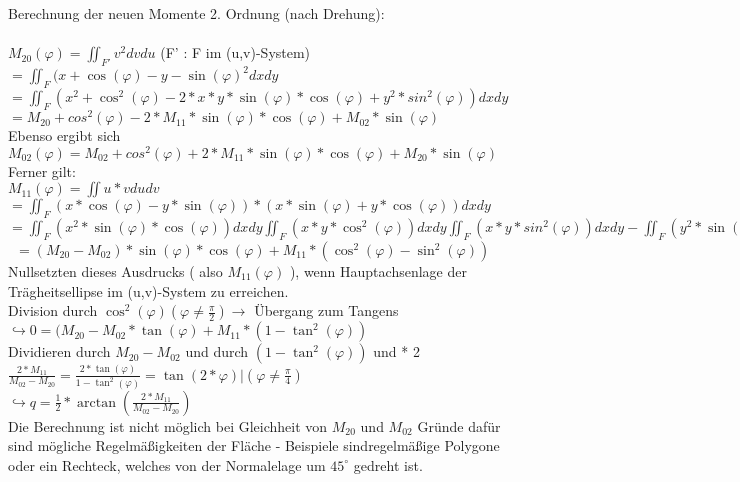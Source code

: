 \documentclass[a4paper,12pt]{scrreprt}
\begin{document}
  
  Berechnung der neuen Momente 2. Ordnung (nach Drehung):\\
  \\
  $M_{20}(\varphi) = \iint_{F'} v^2 dv du$ (F' : F im (u,v)-System)\\
  $ =  \iint_F (x + \cos(\varphi) - y - \sin(\varphi)^2 dx dy $\\
  $ =  \iint_F (x^2 + \cos^2(\varphi) -2*x*y * \sin(\varphi)*\cos(\varphi) + y^2 * sin^2(\varphi)) dx dy $\\
  $ = M_{20} + cos^2(\varphi) - 2 * M_{11} *\sin(\varphi)*\cos(\varphi) + M_{02}*\sin(\varphi)$\\
  Ebenso ergibt sich\
  $ M_02(\varphi) =  M_{02} + cos^2(\varphi) + 2 * M_{11} *\sin(\varphi)*\cos(\varphi) + M_{20}*\sin(\varphi)$\\
  Ferner gilt:\\
  $M_{11}(\varphi) = \iint u * v du dv$\\
  $ = \iint_F ( x *\cos(\varphi) - y * \sin(\varphi) ) *  ( x *\sin(\varphi) + y * \cos(\varphi) ) dx dy $\\
  $ = \iint_F ( x^2 * \sin(\varphi) * \cos(\varphi) ) dxdy \iint_F ( x*y * \cos^2(\varphi) ) dxdy   \iint_F ( x*y*sin^2(\varphi) ) dxdy - \iint_F ( y^2 * \sin(\varphi) * \cos(\varphi) ) dxdy   $\\\
  $ = (M_{20}-M_{02}) * \sin(\varphi) * \cos(\varphi) + M_{11} * (\cos^2(\varphi)-\sin^2(\varphi))$\\
  Nullsetzten dieses Ausdrucks ( also $M_{11} ( \varphi )$ ), wenn Hauptachsenlage der Trägheitsellipse im (u,v)-System zu erreichen.\\
  Division durch $\cos^2(\varphi) ( \varphi \neq \frac{\pi}{2} ) \rightarrow $ Übergang zum Tangens\\
  $\hookrightarrow 0 = (M_{20}-M_{02} * \tan (\varphi) + M_{11} * (1-\tan^2 (\varphi))$\\ 
  Dividieren durch $ M_{20} - M_{02}$ und durch $ (1-\tan^2 (\varphi)) $ und * 2\\
  $\frac{2*M_{11}}{M_{02}-M_{20}} = \frac{2*\tan (\varphi)}{1-\tan^2 (\varphi)} = \tan ( 2 * \varphi ) | (\varphi \neq \frac{\pi}{4}) $\\
  $\hookrightarrow q = \frac{1}{2} * \arctan ( \frac{2 * M_{11}}{M_{02} - M_{20}} ) $\\
  Die Berechnung ist nicht möglich bei Gleichheit von $M_{20}$ und $M_{02} $ Gründe dafür sind mögliche Regelmäßigkeiten der Fläche - Beispiele sindregelmäßige Polygone oder ein Rechteck, welches von der Normalelage um $45^\circ$ gedreht ist. \\
\end{document}
